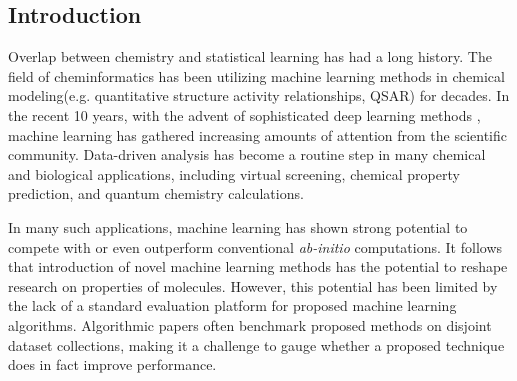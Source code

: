 








\subsection{Introduction} \label{Introduction}

Overlap between chemistry and 
statistical learning has had a long history. The field of cheminformatics has been utilizing machine learning methods in chemical modeling(e.g. quantitative structure activity relationships, QSAR) for decades.\cite{gasteiger1993neural, zupan1999neural, varnek2012machine, mitchell2014machine,devillers1996neural, schneider1998artificial} In the recent 10 years, with the advent of sophisticated deep learning methods \cite{DeepLearning, schmidhuber2015deep}, machine learning has gathered increasing amounts of attention from the scientific community. Data-driven analysis has become a routine step in many chemical and biological applications, including virtual screening\cite{ma2015deep, ramsundar2015massively, unterthiner2014deep, AtomNet}, chemical property prediction\cite{ESOL_dataset, lusci2013deep, SAMPL4, FreeSolv}, and quantum chemistry calculations\cite{GDB7_dataset_prl, GDB7_dataset_arxiv, schutt2016quantum, mcgibbon2017improving}. 

In many such applications, machine learning has shown strong potential to compete with or even outperform conventional \textit{ab-initio} computations\cite{FreeSolv, GDB7_dataset_arxiv}. It follows that introduction of novel machine learning methods has the potential to reshape research on properties of molecules. However, this potential has been limited by the lack of a standard evaluation platform for proposed machine learning algorithms. Algorithmic papers often benchmark proposed methods on disjoint dataset collections, making it a challenge to gauge whether a proposed technique does in fact improve performance.

